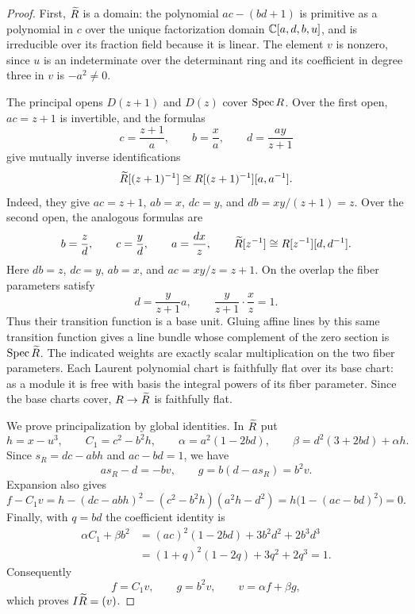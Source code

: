 \begin{proof}
First, $\widetilde R$ is a domain: the polynomial $ac-(bd+1)$ is primitive
as a polynomial in $c$ over the unique factorization domain
$\mathbb C[a,d,b,u]$, and is irreducible over its fraction field because
it is linear. The element $v$ is nonzero, since $u$ is an
indeterminate over the determinant ring and its coefficient in degree
three in $v$ is $-a^2\ne0$.

The principal opens $D(z+1)$ and $D(z)$ cover $\operatorname{Spec} R$.
Over the first open, $ac=z+1$ is invertible, and the formulas
\begin{equation}
\label{bun:first-chart}
 c=\frac{z+1}{a},\qquad b=\frac{x}{a},\qquad
 d=\frac{ay}{z+1}
\end{equation}
give mutually inverse identifications
\[
 \widetilde R[(z+1)^{-1}]
   \cong R[(z+1)^{-1}][a,a^{-1}].
\]
Indeed, they give $ac=z+1$, $ab=x$, $dc=y$, and
$db=xy/(z+1)=z$. Over the second open, the analogous formulas are
\begin{equation}
\label{bun:second-chart}
 b=\frac{z}{d},\qquad c=\frac{y}{d},\qquad a=\frac{dx}{z},
 \qquad
 \widetilde R[z^{-1}]\cong R[z^{-1}][d,d^{-1}].
\end{equation}
Here $db=z$, $dc=y$, $ab=x$, and $ac=xy/z=z+1$.
On the overlap the fiber parameters satisfy
\[
 d=\frac{y}{z+1}a,\qquad
 \frac{y}{z+1}\cdot\frac{x}{z}=1.
\]
Thus their transition function is a base unit. Gluing affine lines
by this same transition function gives a line bundle whose complement
of the zero section is $\operatorname{Spec}\widetilde R$. The indicated weights are exactly
scalar multiplication on the two fiber parameters. Each Laurent
polynomial chart is faithfully flat over its base chart: as a module
it is free with basis the integral powers of its fiber parameter.
Since the base charts cover, $R\to\widetilde R$ is faithfully flat.

We prove principalization by global identities. In $\widetilde R$ put
\[
 h=x-u^3,\qquad C_1=c^2-b^2h,\qquad
 \alpha=a^2(1-2bd),\qquad
 \beta=d^2(3+2bd)+\alpha h.
\]
Since $s_R=dc-abh$ and $ac-bd=1$, we have
\[
 as_R-d=-bv,\qquad
 g=b(d-as_R)=b^2v.
\]
Expansion also gives
\[
 f-C_1v
  =h-(dc-abh)^2-(c^2-b^2h)(a^2h-d^2)
  =h\bigl(1-(ac-bd)^2\bigr)=0.
\]
Finally, with $q=bd$ the coefficient identity is
\begin{align*}
 \alpha C_1+\beta b^2
 &= (ac)^2(1-2bd)+3b^2d^2+2b^3d^3\\
 &= (1+q)^2(1-2q)+3q^2+2q^3=1.
\end{align*}
Consequently
\begin{equation}
\label{bun:principalization-certificate}
 f=C_1v,\qquad g=b^2v,\qquad v=\alpha f+\beta g,
\end{equation}
which proves $I\widetilde R=(v)$.


\end{proof}
